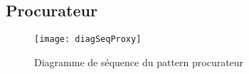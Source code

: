 \subsection{Procurateur}
\begin{figure}[h]
\begin{center}
    \texttt{[image: diagSeqProxy]}
\end{center}
    \caption{Diagramme de séquence du pattern procurateur}
    \label{sequence-procurateur}
\end{figure}